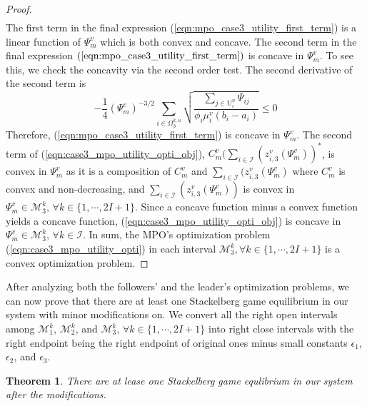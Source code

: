 \documentclass[conference]{IEEEtran}
\newtheorem{theorem}{Theorem}
\begin{document}
\begin{proof}
\begin{align}
\end{align}
The first term in the final expression (\ref{eqn:mpo_case3_utility_first_term}) is a linear function of $\Psi_m^v$ which is both convex and concave. The second term in the final expression $(\ref{eqn:mpo_case3_utility_first_term})$ is concave in $\Psi_m^v$. To see this, we check the concavity via the second order test. The second derivative of the second term is
\begin{equation}
 -\frac{1}{4}(\Psi_m^v)^{-3/2}\sum_{i \in \Omega_3^{k,u}} \sqrt{\frac{\sum_{j \in \mathrm{U}_i^n}\Psi_{ij}}{\phi_i \mu_i^v(b_i-a_i)}} \leq 0
\end{equation}
Therefore, (\ref{eqn:mpo_case3_utility_first_term}) is concave in $\Psi_m^v$. The second term of (\ref{eqn:case3_mpo_utility_opti_obj}), $C_m^v\big(\sum_{i \in \mathcal{I}} (z_{i,3}^v(\Psi_m^v))^*$, is convex in $\Psi_m^v$ as it is a composition of $C_m^v$ and $\sum_{i \in \mathcal{I}} (z_{i,3}^v(\Psi_m^v)$ where $C_m^v$ is convex and non-decreasing, and $\sum_{i \in \mathcal{I}} (z_{i,3}^v(\Psi_m^v))$ is convex in $\Psi_m^v \in \mathcal{M}_3^k,\, \forall k \in \{1, \cdots, 2I+1\}$. Since a concave function minus a convex function yields a concave function, (\ref{eqn:case3_mpo_utility_opti_obj}) is concave in $\Psi_m^v \in \mathcal{M}_3^k,\, \forall k \in \mathcal{I}$. In sum, the MPO's optimization problem (\ref{eqn:case3_mpo_utility_opti}) in each interval $\mathcal{M}_3^k, \forall k \in \{1, \cdots, 2I+1\}$ is a convex optimization problem. \qedhere
\end{proof}
After analyzing both the followers' and the leader's optimization problems, we can now prove that there are at least one Stackelberg game equilibrium in our system with minor modifications on. We convert all the right open intervals among $\mathcal{M}_1^k$, $\mathcal{M}_2^k$, and $\mathcal{M}_3^k$, $\forall k \in \{1, \cdots, 2I+1\}$ into right close intervals with the right endpoint being the right endpoint of original ones minus small constants $\epsilon_1$, $\epsilon_2$, and $\epsilon_3$.
\begin{theorem} \label{thm:stackelberg_game_equilibrium}
There are at lease one Stackelberg game equlibrium in our system after the modifications.
\end{theorem}
\end{document}
